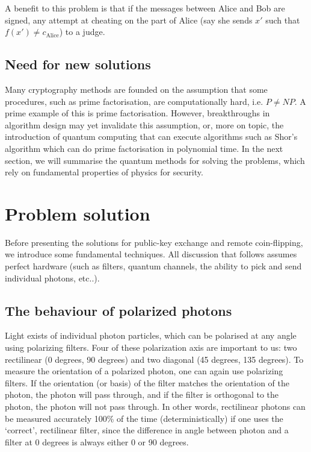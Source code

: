 \documentclass[oneside,a4paper]{article}
\begin{document}
A benefit to this problem is that if the messages between Alice and Bob are signed, any attempt at cheating on the part of Alice (say she sends $x'$ such that $f(x') \neq c_{\text{Alice}}$) to a judge.


\subsection{Need for new solutions}
Many cryptography methods are founded on the assumption that some procedures, such as prime factorisation, are computationally hard, i.e. $P \neq NP$.
A prime example of this is prime factorisation.
However, breakthroughs in algorithm design may yet invalidate this assumption, or, more on topic, the introduction of quantum computing that can execute algorithms such as Shor's algorithm which can do prime factorisation in polynomial time.
In the next section, we will summarise the quantum methods for solving the problems, which rely on fundamental properties of physics for security.

\section{Problem solution}
Before presenting the solutions for public-key exchange and remote coin-flipping, we introduce some fundamental techniques.
All discussion that follows assumes perfect hardware (such as filters, quantum channels, the ability to pick and send individual photons, etc..).

\subsection{The behaviour of polarized photons}
Light exists of individual photon particles, which can be polarised at any angle using polarizing filters.
Four of these polarization axis are important to us: two rectilinear (0 degrees, 90 degrees) and two diagonal (45 degrees, 135 degrees).
To measure the orientation of a polarized photon, one can again use polarizing filters.
If the orientation (or basis) of the filter matches the orientation of the photon, the photon will pass through, and if the filter is orthogonal to the photon, the photon will not pass through.
In other words, rectilinear photons can be measured accurately 100\% of the time (deterministically) if one uses the `correct', rectilinear filter, since the difference in angle between photon and a filter at 0 degrees is always either 0 or 90 degrees.
\end{document}

